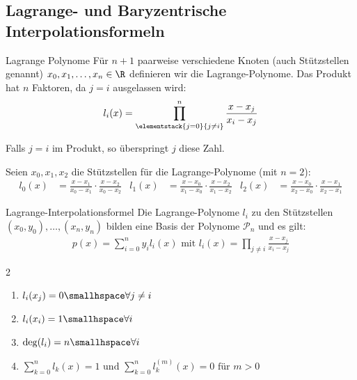 
\newsection
\subsection{Lagrange- und Baryzentrische Interpolationsformeln}
\label{sec:barycentric-interpolation}

\begin{definition}[]{Lagrange Polynome}
    Für $n + 1$ paarweise verschiedene Knoten (auch Stützstellen genannt) $x_0, x_1, \ldots, x_n \in \R$ definieren wir die Lagrange-Polynome. Das Produkt hat $n$ Faktoren, da $j = i$ ausgelassen wird:
    \begin{align*}
        l_i(x) = \prod_{\elementstack{j = 0}{j \neq i}}^n \frac{x - x_j}{x_i - x_j}
    \end{align*}
\end{definition}
Falls $j = i$ im Produkt, so überspringt $j$ diese Zahl.

\inlineex Seien $x_0, x_1, x_2$ die Stützstellen für die Lagrange-Polynome (mit $n = 2$):
\begin{align*}
    l_0(x) & = \frac{x - x_1}{x_0 - x_1} \cdot \frac{x - x_2}{x_0 - x_2} &
    l_1(x) & = \frac{x - x_0}{x_1 - x_0} \cdot \frac{x - x_2}{x_1 - x_2} &
    l_2(x) & = \frac{x - x_0}{x_2 - x_0} \cdot \frac{x - x_1}{x_2 - x_1}
\end{align*}


\begin{theorem}[]{Lagrange-Interpolationsformel}
    Die Lagrange-Polynome $l_i$ zu den Stützstellen $(x_0, y_0), \ldots, (x_n, y_n)$ bilden eine Basis der Polynome $\mathcal{P}_n$ und es gilt:
    \begin{align*}
        p(x) = \sum_{i = 0}^{n} y_i l_i(x) \text{ mit } l_i(x) = \prod_{j \neq i} \frac{x - x_j}{x_i - x_j}
    \end{align*}
\end{theorem}


\rmvspace
\begin{multicols}{2}
    \begin{enumerate}
        \item $l_i(x_j) = 0 \smallhspace \forall j \neq i$
        \item $l_i(x_i) = 1 \smallhspace \forall i$
        \item $\deg(l_i) = n \smallhspace \forall i$
        \item $\sum_{k = 0}^{n} l_k(x) = 1 \text{ und } \sum_{k = 0}^{n} l_k^{(m)}(x) = 0 \text{ für } m > 0$
    \end{enumerate}
\end{multicols}

